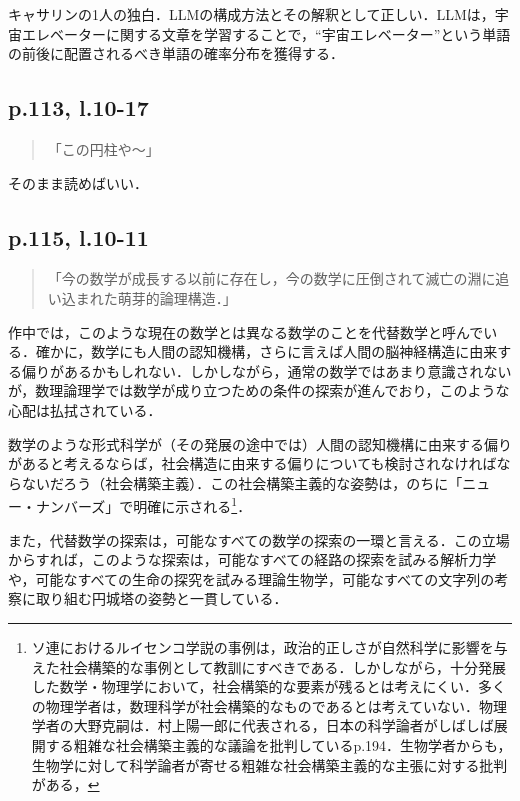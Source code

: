 \documentclass[10pt, a5paper, twoside]{ltjsarticle}
\begin{document}
            キャサリンの1人の独白．LLMの構成方法とその解釈として正しい．LLMは，宇宙エレベーターに関する文章を学習することで，“宇宙エレベーター”という単語の前後に配置されるべき単語の確率分布を獲得する．

        \subsection{p.113, l.10-17}

            \begin{quote}
                「この円柱や〜」
            \end{quote}

            そのまま読めばいい．

        \subsection{p.115, l.10-11}

            \begin{quote}
                「今の数学が成長する以前に存在し，今の数学に圧倒されて滅亡の淵に追い込まれた萌芽的論理構造．」
            \end{quote}

            作中では，このような現在の数学とは異なる数学のことを代替数学と呼んでいる．確かに，数学にも人間の認知機構，さらに言えば人間の脳神経構造に由来する偏りがあるかもしれない．しかしながら，通常の数学ではあまり意識されないが，数理論理学では数学が成り立つための条件の探索が進んでおり，このような心配は払拭されている．

            数学のような形式科学が（その発展の途中では）人間の認知機構に由来する偏りがあると考えるならば，社会構造に由来する偏りについても検討されなければならないだろう（社会構築主義）．この社会構築主義的な姿勢は，のちに「ニュー・ナンバーズ」で明確に示される\footnote{ソ連におけるルイセンコ学説の事例は，政治的正しさが自然科学に影響を与えた社会構築的な事例として教訓にすべきである．しかしながら，十分発展した数学・物理学において，社会構築的な要素が残るとは考えにくい．多くの物理学者は，数理科学が社会構築的なものであるとは考えていない．物理学者の大野克嗣は．村上陽一郎に代表される，日本の科学論者がしばしば展開する粗雑な社会構築主義的な議論を批判している\cite{oono}p.194．生物学者からも，生物学に対して科学論者が寄せる粗雑な社会構築主義的な主張に対する批判がある\cite{hasegawa,minaka}，}．

            また，代替数学の探索は，可能なすべての数学の探索の一環と言える．この立場からすれば，このような探索は，可能なすべての経路の探索を試みる解析力学や，可能なすべての生命の探究を試みる理論生物学，可能なすべての文字列の考察に取り組む円城塔の姿勢と一貫している．
\end{document}

